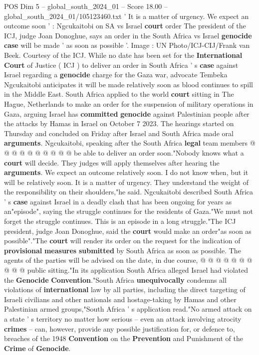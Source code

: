 \begin{textsample}{POS Dim 5 – global\_south\_2024\_01 – Score 18.00 – global\_south\_2024\_01/105123460.txt}  \label{ex:f5_pos_016}
' It is a matter of urgency.
We expect an outcome soon ' : Ngcukaitobi on SA vs Israel \textbf{court} order The president of the ICJ, judge Joan Donoghue, says an order in the South Africa vs Israel \textbf{genocide} \textbf{case} will be made ' as soon as possible '.
Image : UN Photo/ICJ-CIJ/Frank van Beek.
Courtesy of the ICJ.
While no date has been set for the \textbf{International} \textbf{Court} of Justice ( ICJ ) to deliver an order in South Africa ' s \textbf{case} against Israel regarding a \textbf{genocide} charge for the Gaza war, advocate Tembeka Ngcukaitobi anticipates it will be made relatively soon as blood continues to spill in the Middle East.
South Africa applied to the world \textbf{court} sitting in The Hague, Netherlands to make an order for the suspension of military operations in Gaza, arguing Israel has \textbf{committed} \textbf{genocide} against Palestinian people after the attacks by Hamas in Israel on October 7 2023.
The hearings started on Thursday and concluded on Friday after Israel and South Africa made oral \textbf{arguments}.
Ngcukaitobi, speaking after the South Africa \textbf{legal} team members @ @ @ @ @ @ @ @ @ @ be able to deliver an order soon."Nobody knows what a \textbf{court} will decide.
They judges will apply themselves after hearing the \textbf{arguments}.
We expect an outcome relatively soon.
I do not know when, but it will be relatively soon.
It is a matter of urgency.
They understand the weight of the responsibility on their shoulders,"he said.
Ngcukaitobi described South Africa ' s \textbf{case} against Israel in a deadly clash that has been ongoing for years as an"episode", saying the struggle continues for the residents of Gaza."We must not forget the struggle continues.
This is an episode in a long struggle."The ICJ president, judge Joan Donoghue, said the \textbf{court} would make an order"as soon as possible"."The \textbf{court} will render its order on the request for the indication of \textbf{provisional} \textbf{measures} \textbf{submitted} by South Africa as soon as possible.
The agents of the parties will be advised on the date, in due course, @ @ @ @ @ @ @ @ @ @ public sitting."In its application South Africa alleged Israel had violated the \textbf{Genocide} \textbf{Convention}."South Africa \textbf{unequivocally} condemns all violations of \textbf{international} law by all parties, including the direct targeting of Israeli civilians and other nationals and hostage-taking by Hamas and other Palestinian armed groups,"South Africa ' s application read."No armed attack on a state ' s territory no matter how serious -- even an attack involving atrocity \textbf{crimes} -- can, however, provide any possible justification for, or defence to, breaches of the 1948 \textbf{Convention} on the \textbf{Prevention} and Punishment of the \textbf{Crime} of \textbf{Genocide}.

\end{textsample}
